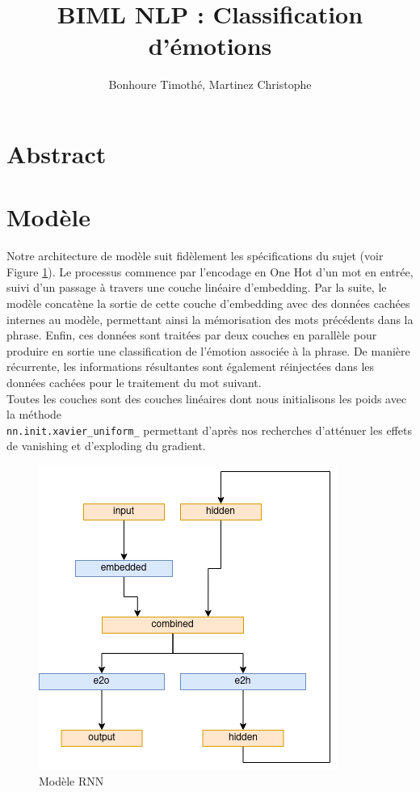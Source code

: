 \documentclass{article}
\begin{document}
\renewcommand{\arraystretch}{1.5}

\title{BIML NLP : Classification d'émotions \\
\footnotesize{}}
\author{Bonhoure Timothé, Martinez Christophe}                      %

\maketitle
\tableofcontents
\section*{Abstract}
\newpage

\section{Modèle}
Notre architecture de modèle suit fidèlement les spécifications du sujet (voir Figure \ref{fig:modele_rnn}). Le processus commence par l'encodage en One Hot d'un mot en entrée, suivi d'un passage à travers une couche linéaire d'embedding. Par la suite, le modèle concatène la sortie de cette couche d'embedding avec des données cachées internes au modèle, permettant ainsi la mémorisation des mots précédents dans la phrase. Enfin, ces données sont traitées par deux couches en parallèle pour produire en sortie une classification de l'émotion associée à la phrase. De manière récurrente, les informations résultantes sont également réinjectées dans les données cachées pour le traitement du mot suivant. \\
Toutes les couches sont des couches linéaires dont nous initialisons les poids avec la méthode\\ \texttt{nn.init.xavier\_uniform\_} permettant d'après nos recherches d'atténuer les effets de vanishing et d'exploding du gradient.

\begin{figure}[H]
    \centering
    \includegraphics[width=0.4\linewidth]{img/modele.png}
    \caption{Modèle RNN}

    \label{fig:modele_rnn}
\end{figure}
\end{document}
